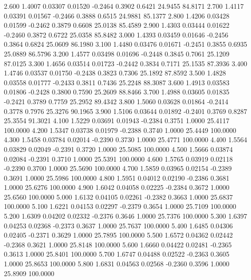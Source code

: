    2.600   1.4007   0.03307   0.01520  -0.2464   0.3902   0.6421  24.9455  84.8171
   2.700   1.4117   0.03391   0.01567  -0.2466   0.3888   0.6515  24.9881  85.1377
   2.800   1.4206   0.03428   0.01599  -0.2462   0.3879   0.6608  25.0138  85.4589
   2.900   1.4303   0.03444   0.01622  -0.2460   0.3872   0.6722  25.0358  85.8482
   3.000   1.4393   0.03459   0.01646  -0.2456   0.3864   0.6824  25.0609  86.1980
   3.100   1.4480   0.03476   0.01671  -0.2451   0.3855   0.6935  25.0889  86.5796
   3.200   1.4577   0.03498   0.01696  -0.2448   0.3845   0.7061  25.1209  87.0125
   3.300   1.4656   0.03514   0.01723  -0.2442   0.3834   0.7171  25.1535  87.3936
   3.400   1.4746   0.03537   0.01750  -0.2438   0.3823   0.7306  25.1892  87.8592
   3.500   1.4828   0.03558   0.01777  -0.2433   0.3811   0.7436  25.2248  88.3087
   3.600   1.4913   0.03583   0.01806  -0.2428   0.3800   0.7590  25.2609  88.8466
   3.700   1.4988   0.03605   0.01835  -0.2421   0.3789   0.7759  25.2952  89.4342
   3.800   1.5060   0.03628   0.01864  -0.2414   0.3778   0.7976  25.3276  90.1965
   3.900   1.5106   0.03644   0.01892  -0.2401   0.3769   0.8287  25.3554  91.3021
   4.100   1.5229   0.03691   0.01943  -0.2384   0.3751   1.0000  25.4117 100.0000
   4.200   1.5347   0.03738   0.01979  -0.2388   0.3740   1.0000  25.4449 100.0000
   4.300   1.5458   0.03784   0.02014  -0.2390   0.3730   1.0000  25.4771 100.0000
   4.400   1.5564   0.03829   0.02049  -0.2391   0.3720   1.0000  25.5085 100.0000
   4.500   1.5666   0.03874   0.02084  -0.2391   0.3710   1.0000  25.5391 100.0000
   4.600   1.5765   0.03919   0.02118  -0.2390   0.3700   1.0000  25.5690 100.0000
   4.700   1.5859   0.03965   0.02154  -0.2389   0.3691   1.0000  25.5986 100.0000
   4.800   1.5951   0.04012   0.02190  -0.2386   0.3681   1.0000  25.6276 100.0000
   4.900   1.6042   0.04058   0.02225  -0.2384   0.3672   1.0000  25.6560 100.0000
   5.000   1.6132   0.04105   0.02261  -0.2382   0.3663   1.0000  25.6837 100.0000
   5.100   1.6221   0.04153   0.02297  -0.2379   0.3654   1.0000  25.7109 100.0000
   5.200   1.6309   0.04202   0.02332  -0.2376   0.3646   1.0000  25.7376 100.0000
   5.300   1.6397   0.04253   0.02368  -0.2373   0.3637   1.0000  25.7637 100.0000
   5.400   1.6485   0.04306   0.02405  -0.2371   0.3629   1.0000  25.7895 100.0000
   5.500   1.6572   0.04362   0.02442  -0.2368   0.3621   1.0000  25.8148 100.0000
   5.600   1.6660   0.04422   0.02481  -0.2365   0.3613   1.0000  25.8401 100.0000
   5.700   1.6747   0.04488   0.02522  -0.2363   0.3605   1.0000  25.8653 100.0000
   5.800   1.6831   0.04563   0.02568  -0.2360   0.3596   1.0000  25.8909 100.0000
